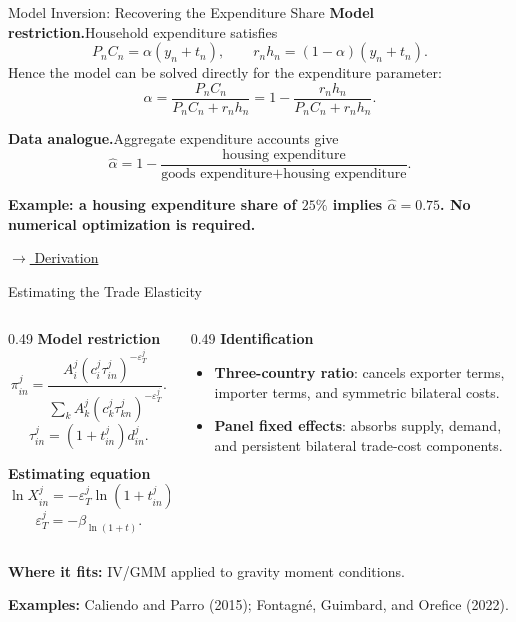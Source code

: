 \documentclass[aspectratio=169,11pt]{beamer}
\newcommand{\B}[1]{\textcolor{blue1}{\textbf{#1}}}
\newcommand{\hi}[1]{\textcolor{deepred}{\textbf{#1}}}
\newcommand{\derivlink}[1]{%
  \hyperlink{#1}{\textcolor{blue1}{\footnotesize
  \(\longrightarrow\) Derivation}}}
\begin{document}
\begin{frame}[t]{Model Inversion: Recovering the Expenditure Share}
  \small
  \B{Model restriction.}\quad Household expenditure satisfies
  \[
    P_nC_n=\alpha(y_n+t_n),
    \qquad
    r_nh_n=(1-\alpha)(y_n+t_n).
  \]
  Hence the model can be solved directly for the expenditure parameter:
  \[
    \alpha
      =\frac{P_nC_n}{P_nC_n+r_nh_n}
      =1-\frac{r_nh_n}{P_nC_n+r_nh_n}.
  \]

  \medskip
  \B{Data analogue.}\quad Aggregate expenditure accounts give
  \[
    \widehat\alpha
      =
      1-
      \frac{\text{housing expenditure}}
           {\text{goods expenditure}+\text{housing expenditure}}.
  \]

  \vfill
  \hi{Example: a housing expenditure share of \(25\%\) implies
  \(\widehat\alpha=0.75\). No numerical optimization is required.}

  \hfill\derivlink{appHousingIncome}
\end{frame}

\setcounter{subsection}{0}

\begin{frame}[t]{Estimating the Trade Elasticity}
  \small
  \begin{columns}[T,onlytextwidth]
    \begin{column}{0.49\textwidth}
      \B{Model restriction}
      \[
        \pi_{in}^j
          =\frac{A_i^j(c_i^j\tau_{in}^j)^{-\varepsilon_T^j}}
          {\displaystyle\sum_k A_k^j(c_k^j\tau_{kn}^j)^{-\varepsilon_T^j}}.
      \]
      \[
        \tau_{in}^j=(1+t_{in}^j)d_{in}^j.
      \]

      \B{Estimating equation}
      \[
        \ln X_{in}^j
          =-\varepsilon_T^j\ln(1+t_{in}^j)
           +\alpha_i^j+\delta_n^j+\gamma_{in}^j+u_{in}^j,
      \]
      \[
        \varepsilon_T^j=-\beta_{\ln(1+t)}.
      \]
    \end{column}
    \begin{column}{0.49\textwidth}
      \B{Identification}
      \begin{itemize}\setlength{\itemsep}{8pt}
        \item \B{Three-country ratio}: cancels exporter terms, importer terms,
          and symmetric bilateral costs.
        \item \B{Panel fixed effects}: absorbs supply, demand, and persistent
          bilateral trade-cost components.
      \end{itemize}

    \end{column}
  \end{columns}

  \vfill
  {\footnotesize \B{Where it fits:} IV/GMM applied to gravity moment conditions.\par}
  \smallskip
  {\scriptsize \B{Examples:}
  Caliendo and Parro (2015); Fontagn\'e, Guimbard, and Orefice (2022).}
\end{frame}
\end{document}
